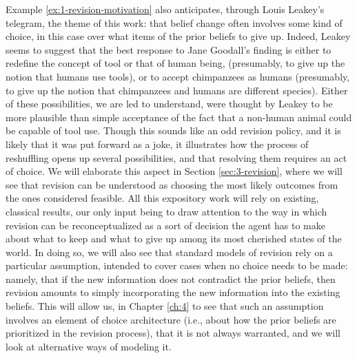 Example \ref{ex:1-revision-motivation} also anticipates, 
through Louis Leakey's telegram, the theme of this work:
that belief change often involves some kind of choice,
in this case over what items of the prior beliefs to give up.
Indeed, Leakey seems to suggest
that the best response to Jane Goodall's finding is either 
to redefine the concept of tool or that of human being, 
(presumably, to give up the notion that humans use tools),
or to accept chimpanzees as humans
(presumably, to give up the notion that chimpanzees and humans are different species).
Either of these possibilities, we are led to understand, were thought by Leakey 
to be more plausible than simple acceptance of the fact that a non-human animal
could be capable of tool use.
Though this sounds like an odd revision policy,
and it is likely that it was put forward as a joke,
it illustrates how the process of reshuffling opens up several possibilities, 
and that resolving them requires an act of choice.
We will elaborate this aspect in Section \ref{sec:3-revision},
where we will see that revision can be understood as choosing 
the most likely outcomes from the ones considered feasible.
All this expository work will rely on existing, classical results,
our only input being to draw attention to the way 
in which revision can be reconceptualized 
as a sort of decision the agent has to make about what to keep 
and what to give up among its most cherished states of the world.
In doing so, we will also see that standard models of revision 
rely on a particular assumption, intended to cover cases when no 
choice needs to be made: namely, that if the new information does not 
contradict the prior beliefs, then revision amounts to simply incorporating 
the new information into the existing beliefs.
This will allow us, in Chapter \ref{ch:4} to see that such an
assumption involves an element of choice architecture
(i.e., about how the prior beliefs are prioritized in the revision process),
that it is not always warranted,
and we will look at alternative ways of modeling it.

